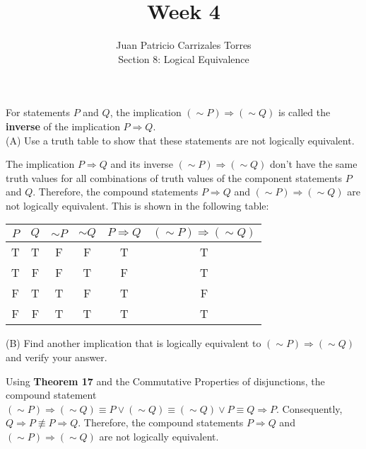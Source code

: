 \documentclass[12pt]{article}
\newenvironment{problem}[2][Problem]{\begin{trivlist}
		\item[\hskip \labelsep {\bfseries #1}\hskip \labelsep {\bfseries #2.}]}{\end{trivlist}}
\newenvironment{solution}[2][Solution]{\begin{trivlist}
		\item[\hskip \labelsep {\bfseries #1}\hskip \labelsep {\bfseries #2.}]}{\end{trivlist}}
\begin{document}
	
	\title{Week 4}
	\author{Juan Patricio Carrizales Torres \\
		Section 8: Logical Equivalence}
	
	\maketitle

\begin{problem}{51}
	For statements $P$ and $Q$, the implication $(\sim P) \Rightarrow (\sim Q)$ is called the \textbf{inverse} of the implication $P \Rightarrow Q$.\\
	
	(A) Use a truth table to show that these statements are not logically equivalent.
	\begin{solution}{a}
		The implication $P \Rightarrow Q$ and its inverse $(\sim P) \Rightarrow (\sim Q)$ don't have the same truth values for all combinations of truth values of the component statements $P$ and $Q$. Therefore, the compound statements $P \Rightarrow Q$ and $(\sim P) \Rightarrow (\sim Q)$ are not logically equivalent.	This is shown in the following table:
			\begin{center}
			\begin{tabular}{c c c c c c}
				$P$ & $Q$ & $\sim P$ & $\sim Q$ & $P \Rightarrow Q$ & $(\sim P) \Rightarrow (\sim Q)$\\
				\hline
				T & T & F & F & T & T\\
				T & F & F & T & F & T\\
				F & T & T & F & T & F\\
				F & F & T & T & T & T\\
				\hline
			\end{tabular}
		\end{center}
	\end{solution}
	(B) Find another implication that is logically equivalent to $(\sim P) \Rightarrow (\sim Q)$ and verify your answer.
	\begin{solution}{b}
		Using \textbf{Theorem 17} and the Commutative Properties of disjunctions, the compound statement $(\sim P) \Rightarrow (\sim Q) \equiv P\vee (\sim Q)\equiv (\sim Q) \vee P \equiv Q \Rightarrow P$. Consequently, $Q \Rightarrow P \not\equiv P \Rightarrow Q$. Therefore, the compound statements $P \Rightarrow Q$ and $(\sim P) \Rightarrow (\sim Q)$ are not logically equivalent.
	\end{solution}
\end{problem}
\end{document}
